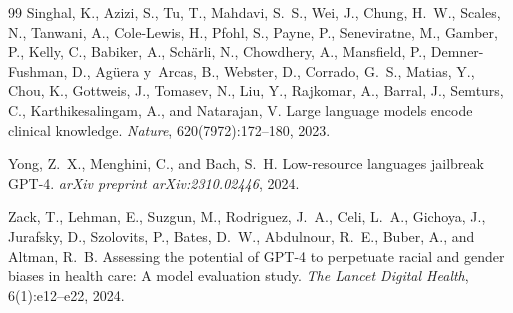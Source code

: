 \documentclass[11pt,a4paper]{article}
\begin{document}
\begin{thebibliography}{99}
Singhal, K., Azizi, S., Tu, T., Mahdavi, S.~S., Wei, J., Chung, H.~W., Scales, N., Tanwani, A., Cole-Lewis, H., Pfohl, S., Payne, P., Seneviratne, M., Gamber, P., Kelly, C., Babiker, A., Sch\"{a}rli, N., Chowdhery, A., Mansfield, P., Demner-Fushman, D., Ag\"{u}era y~Arcas, B., Webster, D., Corrado, G.~S., Matias, Y., Chou, K., Gottweis, J., Tomasev, N., Liu, Y., Rajkomar, A., Barral, J., Semturs, C., Karthikesalingam, A., and Natarajan, V.
\newblock Large language models encode clinical knowledge.
\newblock \textit{Nature}, 620(7972):172--180, 2023.

Yong, Z.~X., Menghini, C., and Bach, S.~H.
\newblock Low-resource languages jailbreak GPT-4.
\newblock \textit{arXiv preprint arXiv:2310.02446}, 2024.

Zack, T., Lehman, E., Suzgun, M., Rodriguez, J.~A., Celi, L.~A., Gichoya, J., Jurafsky, D., Szolovits, P., Bates, D.~W., Abdulnour, R.~E., Buber, A., and Altman, R.~B.
\newblock Assessing the potential of GPT-4 to perpetuate racial and gender biases in health care: A model evaluation study.
\newblock \textit{The Lancet Digital Health}, 6(1):e12--e22, 2024.

\end{thebibliography}
\end{document}

